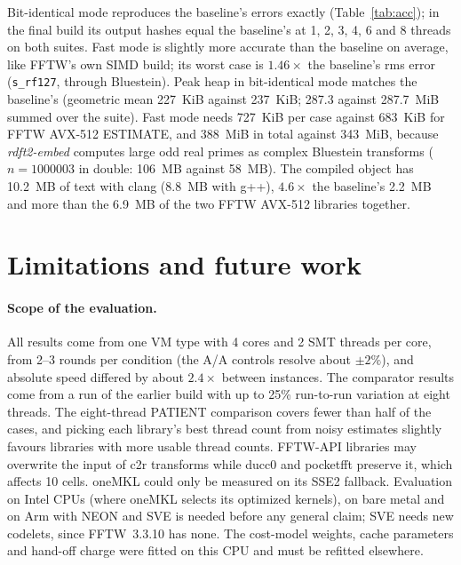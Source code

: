\documentclass[10pt]{article}
\theoremstyle{definition}
\begin{document}
Bit-identical mode reproduces the baseline's errors exactly (Table~\ref{tab:acc}); in the final build its output hashes equal the baseline's at 1, 2, 3, 4, 6 and 8 threads on both suites. Fast mode is slightly more accurate than the baseline on average, like FFTW's own SIMD build; its worst case is $1.46\times$ the baseline's rms error (\texttt{s\_rf127}, through Bluestein). Peak heap in bit-identical mode matches the baseline's (geometric mean 227~KiB against 237~KiB; 287.3 against 287.7~MiB summed over the suite). Fast mode needs 727~KiB per case against 683~KiB for FFTW AVX-512 ESTIMATE, and 388~MiB in total against 343~MiB, because \emph{rdft2-embed} computes large odd real primes as complex Bluestein transforms ($n=1000003$ in double: 106~MB against 58~MB). The compiled object has 10.2~MB of text with clang (8.8~MB with g++), $4.6\times$ the baseline's 2.2~MB and more than the 6.9~MB of the two FFTW AVX-512 libraries together.

\section{Limitations and future work}\label{sec:future}

\paragraph{Scope of the evaluation.} All results come from one VM type with 4 cores and 2 SMT threads per core, from 2--3 rounds per condition (the A/A controls resolve about $\pm2\%$), and absolute speed differed by about $2.4\times$ between instances. The comparator results come from a run of the earlier build with up to 25\% run-to-run variation at eight threads. The eight-thread PATIENT comparison covers fewer than half of the cases, and picking each library's best thread count from noisy estimates slightly favours libraries with more usable thread counts. FFTW-API libraries may overwrite the input of c2r transforms while ducc0 and pocketfft preserve it, which affects 10 cells. oneMKL could only be measured on its SSE2 fallback. Evaluation on Intel CPUs (where oneMKL selects its optimized kernels), on bare metal and on Arm with NEON and SVE is needed before any general claim; SVE needs new codelets, since FFTW~3.3.10 has none. The cost-model weights, cache parameters and hand-off charge were fitted on this CPU and must be refitted elsewhere.
\end{document}
